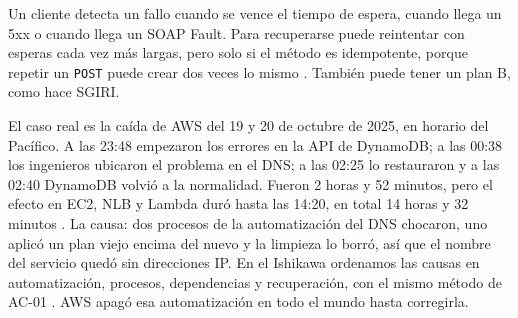 Un cliente detecta un fallo cuando se vence el tiempo de espera, cuando llega un 5xx o cuando llega un SOAP Fault. Para recuperarse puede reintentar con esperas cada vez más largas, pero solo si el método es idempotente, porque repetir un \texttt{POST} puede crear dos veces lo mismo \cite{rfc9110}. También puede tener un plan B, como hace SGIRI.

El caso real es la caída de AWS del 19 y 20 de octubre de 2025, en horario del Pacífico. A las 23:48 empezaron los errores en la API de DynamoDB; a las 00:38 los ingenieros ubicaron el problema en el DNS; a las 02:25 lo restauraron y a las 02:40 DynamoDB volvió a la normalidad. Fueron 2 horas y 52 minutos, pero el efecto en EC2, NLB y Lambda duró hasta las 14:20, en total 14 horas y 32 minutos \cite{aws2025}. La causa: dos procesos de la automatización del DNS chocaron, uno aplicó un plan viejo encima del nuevo y la limpieza lo borró, así que el nombre del servicio quedó sin direcciones IP. En el Ishikawa ordenamos las causas en automatización, procesos, dependencias y recuperación, con el mismo método de AC-01 \cite{soldani2023}. AWS apagó esa automatización en todo el mundo hasta corregirla.
